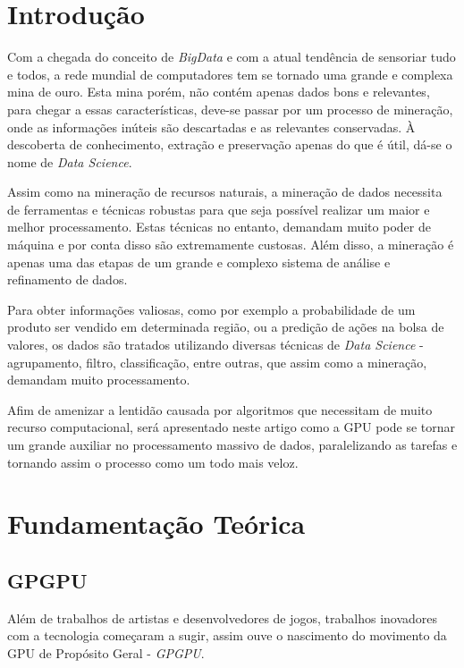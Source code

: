 \documentclass[conference]{IEEEtran}
\begin{document}
	\IEEEpeerreviewmaketitle
	
	
	\section{Introdução}
	Com a chegada do conceito de \textit{BigData} e com a atual tendência de sensoriar tudo e todos, a rede mundial de computadores tem se tornado uma grande e complexa mina de ouro. Esta mina porém, não contém apenas dados bons e relevantes, para chegar a essas características, deve-se passar por um processo de mineração, onde as informações inúteis são descartadas e as relevantes conservadas. À descoberta de conhecimento, extração e preservação apenas do que é útil, dá-se o nome de \textit{Data Science}.
	
	Assim como na mineração de recursos naturais, a mineração de dados necessita de ferramentas e técnicas robustas para que seja possível realizar um maior e melhor processamento. Estas técnicas no entanto, demandam muito poder de máquina e por conta disso são extremamente custosas. Além disso, a mineração é apenas uma das etapas de um grande e complexo sistema de análise e refinamento de dados.
	
	Para obter informações valiosas, como por exemplo a probabilidade de um produto ser vendido em determinada região, ou a predição de ações na bolsa de valores, os dados são tratados utilizando diversas técnicas de \textit{Data Science} - agrupamento, filtro, classificação, entre outras, que assim como a mineração, demandam muito processamento.
	
	Afim de amenizar a lentidão causada por algoritmos que necessitam de muito recurso computacional, será apresentado neste artigo como a GPU pode se tornar um grande auxiliar no processamento massivo de dados, paralelizando as tarefas e tornando assim o processo como um todo mais veloz.
	
	
	\section{Fundamenta\c{c}\~ao Te\'orica}
	
	
	\subsection{GPGPU}
	
	Al\'em de trabalhos de artistas e desenvolvedores de jogos, trabalhos inovadores com a tecnologia come\c{c}aram a sugir, assim ouve o nascimento do movimento da GPU de Prop\'osito Geral  - \textit{GPGPU}.
	
\end{document}
